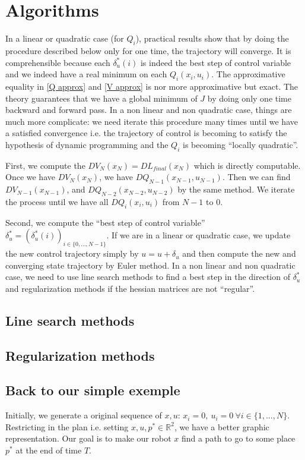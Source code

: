 \documentclass{report}
\begin{document}
\section{Algorithms}
In a linear or quadratic case (for $Q_i$), practical results show that by doing the procedure described below only for one time, the trajectory will converge. It is comprehensible because each $\delta_u^*(i)$ is indeed the best step of control variable and we indeed have a real minimum on each $Q_i(x_i, u_i)$. The approximative equality in \ref{Q approx} and \ref{V approx} is nor more approximative but exact. The theory guarantees that we have a global minimum of $J$ by doing only one time backward and forward pass.
In a non linear and non quadratic case, things are much more complicate: we need iterate this procedure many times until we have a satisfied convergence i.e. the trajectory of control is becoming to satisfy the hypothesis of dynamic programming and the $Q_i$ is becoming ``locally quadratic''.

First, we compute the $DV_N(x_N) = DL_{final}(x_N)$ which is directly computable. Once we have $DV_N(x_N)$, we have $DQ_{N-1}(x_{N-1}, u_{N-1})$. Then we can find $DV_{N-1}(x_{N-1})$, and $DQ_{N-2}(x_{N-2}, u_{N-2})$ by the same method. We iterate the process until we have all $DQ_i(x_i, u_i)$ from $N-1$ to $0$. 

Second, we compute the ``best step of control variable'' $\delta_u^* = (\delta_u^*(i))_{i\in \{0,...,N-1\}}$. If we are in a linear or quadratic case, we update the new control trajectory simply by $u = u + \delta_u$ and then compute the new and converging state trajectory by Euler method. In a non linear and non quadratic case, we need to use line search methods  to find a best step in the direction of $\delta_u^*$ and regularization methods if the hessian matrices are not ``regular''.

\subsection{Line search methods}

\subsection{Regularization methods}



\subsection*{Back to our simple exemple}
Initially, we generate a original sequence of $x, u$: $x_i =0, \ u_i =0 \ \forall i \in \{1,...,N \}$. Restricting in the plan i.e. setting $x,u,p^* \in \mathbb{R}^2$, we have a better graphic representation. Our goal is to make our robot $x$ find a path to go to some place $p^*$ at the end of time $T$.
\end{document}
